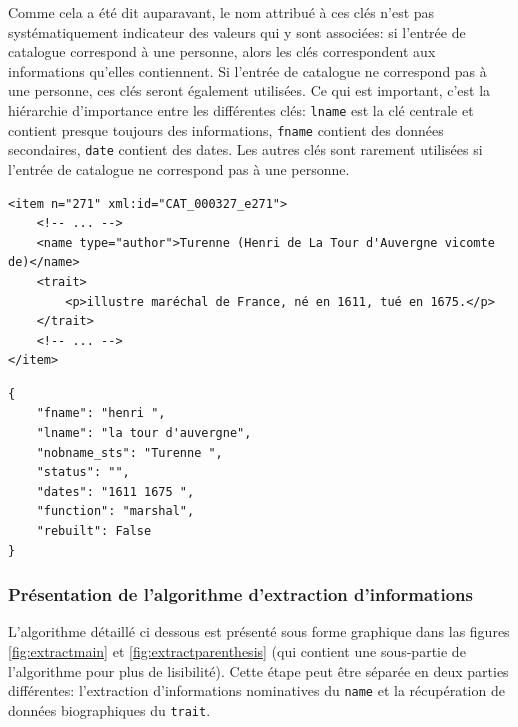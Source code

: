 \documentclass[a4paper, 12pt, twoside]{book}
\newenvironment{code}{\captionsetup{type=listing}}{}
\newcommand{\json}{\texttt{JSON}}
\newcommand{\tname}{\texttt{name}}
\newcommand{\ttrait}{\texttt{trait}}
\newcommand{\xmltei}{\texttt{XML-TEI}}
\begin{document}
Comme cela a été dit auparavant, le nom attribué à ces clés n'est pas systématiquement indicateur des valeurs qui y sont associées: si l'entrée de catalogue correspond à une personne, alors les clés correspondent aux informations qu'elles contiennent. Si l'entrée de catalogue ne correspond pas à une personne, ces clés seront également utilisées. Ce qui est important, c'est la hiérarchie d'importance entre les différentes clés: \texttt{lname} est la clé centrale et contient presque toujours des informations, \texttt{fname} contient des données secondaires, \texttt{date} contient des dates. Les autres clés sont rarement utilisées si l'entrée de catalogue ne correspond pas à une personne.

\begin{code}
	\begin{verbatim}
<item n="271" xml:id="CAT_000327_e271">
	<!-- ... -->
	<name type="author">Turenne (Henri de La Tour d'Auvergne vicomte de)</name>
	<trait>
		<p>illustre maréchal de France, né en 1611, tué en 1675.</p>
	</trait>
	<!-- ... -->
</item>
	\end{verbatim}
	\caption{L'entrée \xmltei{} à partir de laquelle des données sont extraites}
	\label{code:prepin}
\end{code}

\begin{code}
	\begin{verbatim}
{
	"fname": "henri ", 
	"lname": "la tour d'auvergne", 
	"nobname_sts": "Turenne ", 
	"status": "", 
	"dates": "1611 1675 ", 
	"function": "marshal", 
	"rebuilt": False
}
	\end{verbatim}
	\caption{La sortie \json{} correspondante}
	\label{code:prepout}
\end{code}

\subsubsection{Présentation de l'algorithme d'extraction d'informations}
L'algorithme détaillé ci dessous est présenté sous forme graphique dans las figures \ref{fig:extractmain} et \ref{fig:extractparenthesis} (qui contient une sous-partie de l'algorithme pour plus de lisibilité). Cette étape peut être séparée en deux parties différentes: l'extraction d'informations nominatives du \tname{} et la récupération de données biographiques du \ttrait{}.
\end{document}
